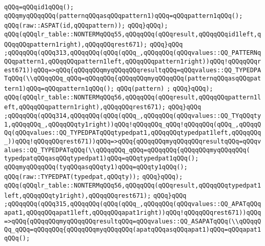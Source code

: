 \verb|qQQq=qQQqid1qQQq();|\newline
\verb|qQQqmyqQQqqQQq(patternqQQqasqQQqpattern1)qQQq=qQQqpattern1qQQq();|\newline
\verb|qQQq(raw::ASPAT(id,qQQqpattern));|\newline
\verb|qQQq}qQQq);|\newline
\verb|qQQq(qQQqlr_table::NONTERMqQQq55,qQQqqQQq(qQQqresult,qQQqqQQqid1left,qQQqqQQqpattern1right),qQQqqQQqrest671);|\newline
\verb|qQQq}qQQq|\newline
\verb|;qQQqqQQq(qQQq313,qQQqqQQq(qQQq(qQQq_,qQQqqQQq(qQQqvalues::QQ_PATTERNqQQqpattern1,qQQqqQQqpattern1left,qQQqqQQqpattern1right))qQQq!qQQqqQQqrest671))qQQq=>qQQq{qQQqqQQqmyqQQqqQQqresultqQQq=qQQqvalues::QQ_TYPEDPATqQQq(\\qQQqqQQq_qQQq=qQQqqQQq{qQQqqQQqmyqQQqqQQq(patternqQQqasqQQqpattern1)qQQq=qQQqpattern1qQQq();|\newline
\verb|qQQq(pattern)|\newline
\verb|;|\newline
\verb|qQQq}qQQq);|\newline
\verb|qQQq(qQQqlr_table::NONTERMqQQq56,qQQqqQQq(qQQqresult,qQQqqQQqpattern1left,qQQqqQQqpattern1right),qQQqqQQqrest671);|\newline
\verb|qQQq}qQQq|\newline
\verb|;qQQqqQQq(qQQq314,qQQqqQQq(qQQq(qQQq_,qQQqqQQq(qQQqvalues::QQ_TYqQQqty1,qQQqqQQq_,qQQqqQQqty1right))qQQq!qQQqqQQq_qQQq!qQQqqQQq(qQQq_,qQQqqQQq(qQQqvalues::QQ_TYPEDPATqQQqtypedpat1,qQQqqQQqtypedpat1left,qQQqqQQq_))qQQq!qQQqqQQqrest671))qQQq=>qQQq{qQQqqQQqmyqQQqqQQqresultqQQq=qQQqvalues::QQ_TYPEDPATqQQq(\\qQQqqQQq_qQQq=qQQqqQQq{qQQqqQQqmyqQQqqQQq(|\newline
\verb|typedpatqQQqasqQQqtypedpat1)qQQq=qQQqtypedpat1qQQq();|\newline
\verb|qQQqmyqQQqqQQq(tyqQQqasqQQqty1)qQQq=qQQqty1qQQq();|\newline
\verb|qQQq(raw::TYPEDPAT(typedpat,qQQqty));|\newline
\verb|qQQq}qQQq);|\newline
\verb|qQQq(qQQqlr_table::NONTERMqQQq56,qQQqqQQq(qQQqresult,qQQqqQQqtypedpat1left,qQQqqQQqty1right),qQQqqQQqrest671);|\newline
\verb|qQQq}qQQq|\newline
\verb|;qQQqqQQq(qQQq315,qQQqqQQq(qQQq(qQQq_,qQQqqQQq(qQQqvalues::QQ_APATqQQqapat1,qQQqqQQqapat1left,qQQqqQQqapat1right))qQQq!qQQqqQQqrest671))qQQq=>qQQq{qQQqqQQqmyqQQqqQQqresultqQQq=qQQqvalues::QQ_ASAPATqQQq(\\qQQqqQQq_qQQq=qQQqqQQq{qQQqqQQqmyqQQqqQQq(apatqQQqasqQQqapat1)qQQq=qQQqapat1qQQq();|\newline
